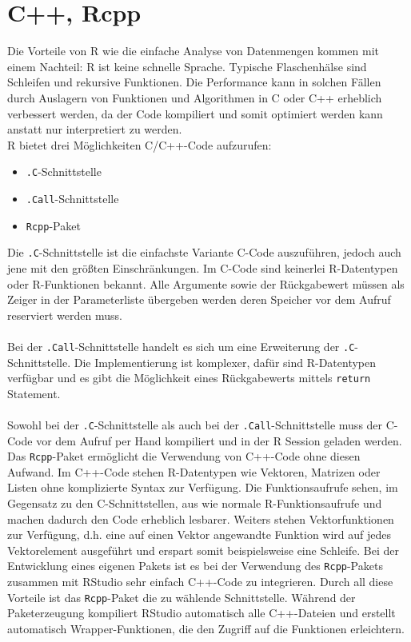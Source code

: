 \section{C++, Rcpp}
\label{kapitel:rcpp}
Die Vorteile von R wie die einfache Analyse von Datenmengen kommen mit einem Nachteil: R ist keine schnelle Sprache. Typische Flaschenhälse sind Schleifen und rekursive Funktionen. Die Performance kann in solchen Fällen durch Auslagern von Funktionen und Algorithmen in C oder C++ erheblich verbessert werden, da der Code kompiliert und somit optimiert werden kann anstatt nur interpretiert zu werden.\\
R bietet drei Möglichkeiten C/C++-Code aufzurufen:
\begin{itemize}
	\item \texttt{.C}-Schnittstelle
	\item \texttt{.Call}-Schnittstelle
	\item \texttt{Rcpp}-Paket
\end{itemize}
Die \texttt{.C}-Schnittstelle ist die einfachste Variante C-Code auszuführen, jedoch auch jene mit den größten Einschränkungen. Im C-Code sind keinerlei R-Datentypen oder R-Funktionen bekannt. Alle Argumente sowie der Rückgabewert müssen als Zeiger in der Parameterliste übergeben werden deren Speicher vor dem Aufruf reserviert werden muss.
\\
\\
Bei der \texttt{.Call}-Schnittstelle handelt es sich um eine Erweiterung der \texttt{.C}-Schnittstelle. Die Implementierung ist komplexer, dafür sind R-Datentypen verfügbar und es gibt die Möglichkeit eines Rückgabewerts mittels \texttt{return} Statement. \cite{wickham2015r}
\\
\\
Sowohl bei der \texttt{.C}-Schnittstelle als auch bei der \texttt{.Call}-Schnittstelle muss der C-Code vor dem Aufruf per Hand kompiliert und in der R Session geladen werden. Das \texttt{Rcpp}-Paket ermöglicht die Verwendung von C++-Code ohne diesen Aufwand. Im C++-Code stehen R-Datentypen wie Vektoren, Matrizen oder Listen ohne komplizierte Syntax zur Verfügung. Die Funktionsaufrufe sehen, im Gegensatz zu den C-Schnittstellen, aus wie normale R-Funktionsaufrufe und machen dadurch den Code erheblich lesbarer. Weiters stehen Vektorfunktionen zur Verfügung, d.h. eine auf einen Vektor angewandte Funktion wird auf jedes Vektorelement ausgeführt und erspart somit beispielsweise eine Schleife. Bei der Entwicklung eines eigenen Pakets ist es bei der Verwendung des \texttt{Rcpp}-Pakets zusammen mit RStudio sehr einfach C++-Code zu integrieren. Durch all diese Vorteile ist das \texttt{Rcpp}-Paket die zu wählende Schnittstelle. Während der Paketerzeugung kompiliert RStudio automatisch alle C++-Dateien und erstellt automatisch Wrapper-Funktionen, die den Zugriff auf die Funktionen erleichtern.
